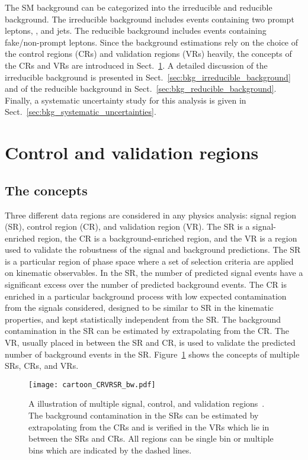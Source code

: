 The SM background can be categorized into the irreducible and reducible background.
The irreducible background includes events containing two prompt leptons, \met, and jets.
The reducible background includes events containing fake/non-prompt leptons.
Since the background estimations rely on the choice of the control regions (CRs) and validation regions (VRs) heavily, the concepts of the CRs and VRs are introduced in Sect.~\ref{sec:bkg_control_and_validation_regions}.
A detailed discussion of the irreducible background is presented in Sect.~\ref{sec:bkg_irreducible_background} and of the reducible background in Sect.~\ref{sec:bkg_reducible_background}.
Finally, a systematic uncertainty study for this analysis is given in Sect.~\ref{sec:bkg_systematic_uncertainties}.


\section{Control and validation regions}
\label{sec:bkg_control_and_validation_regions}


\subsection{The concepts}
\label{subsec:bkg_SRs_CRs_VRs_concepts}
Three different data regions are considered in any physics analysis: signal region (SR), control region (CR), and validation region (VR).
The SR is a signal-enriched region, the CR is a background-enriched region, and the VR is a region used to validate the robustness of the signal and background predictions.
The SR is a particular region of phase space where a set of selection criteria are applied on kinematic observables.
In the SR, the number of predicted signal events have a significant excess over the number of predicted background events.
The CR is enriched in a particular background process with low expected contamination from the signals considered, designed to be similar to SR in the kinematic properties, and kept statistically independent from the SR.
The background contamination in the SR can be estimated by extrapolating from the CR.
The VR, usually placed in between the SR and CR, is used to validate the predicted number of background events in the SR.
Figure~\ref{fig:bkg_SRs_CRs_VRs} shows the concepts of multiple SRs, CRs, and VRs.

\begin{figure}[htbp]
    \begin{center}
        \texttt{[image: cartoon\_CRVRSR\_bw.pdf]}
        \caption{A illustration of multiple signal, control, and validation regions~\cite{Baak:2014wma}.
        The background contamination in the SRs can be estimated by extrapolating from the CRs and is verified in the VRs which lie in between the SRs and CRs.
        All regions can be single bin or multiple bins which are indicated by the dashed lines.}
        \label{fig:bkg_SRs_CRs_VRs}
    \end{center}
\end{figure}


